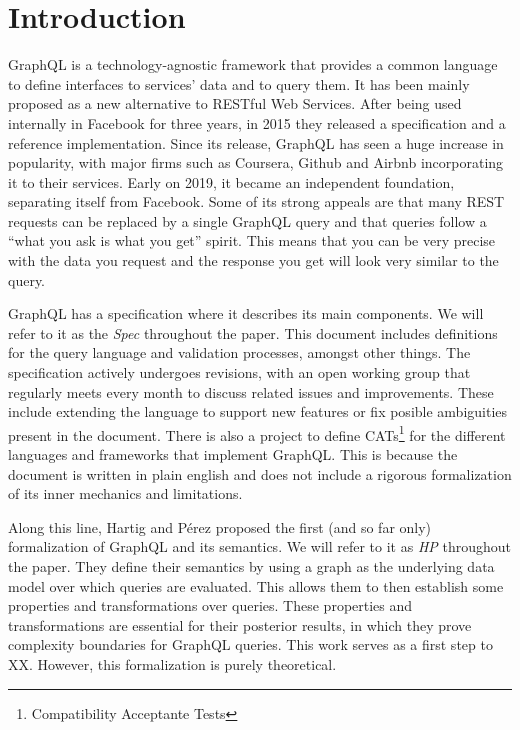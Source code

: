 
\section{Introduction}

GraphQL is a technology-agnostic framework that provides a common language to define interfaces to services' data and to query them. It has been mainly proposed as a new alternative to RESTful Web Services. After being used internally in Facebook for three years, in 2015 they released a specification and a reference implementation. Since its release, GraphQL has seen a huge increase in popularity, with major firms such as Coursera, Github and Airbnb incorporating it to their services. Early on 2019, it became an independent foundation, separating itself from Facebook. Some of its strong appeals are that many REST requests can be replaced by a single GraphQL query and that queries follow a ``what you ask is what you get'' spirit. This means that you can be very precise with the data you request and the response you get will look very similar to the query.

GraphQL has a specification where it describes its main components. We will refer to it as the \textit{Spec} throughout the paper. This document includes definitions for the query language and validation processes, amongst other things. The specification actively undergoes revisions, with an open working group that regularly meets every month to discuss related issues and improvements. These include extending the language to support new features or fix posible ambiguities present in the document. There is also a project to define CATs\footnote{Compatibility Acceptante Tests} for the different languages and frameworks that implement GraphQL. This is because the document is written in plain english and does not include a rigorous formalization of its inner mechanics and limitations.

Along this line, Hartig and Pérez proposed the first (and so far only) formalization of GraphQL and its semantics\cite{gqlph}. We will refer to it as \textit{HP} throughout the paper. They define their semantics by using a graph as the underlying data model over which queries are evaluated. This allows  them to then establish some properties and transformations over queries. These properties and transformations are essential for their posterior results, in which they prove complexity boundaries for GraphQL queries. This work serves as a first step to XX. However, this formalization is purely theoretical.

